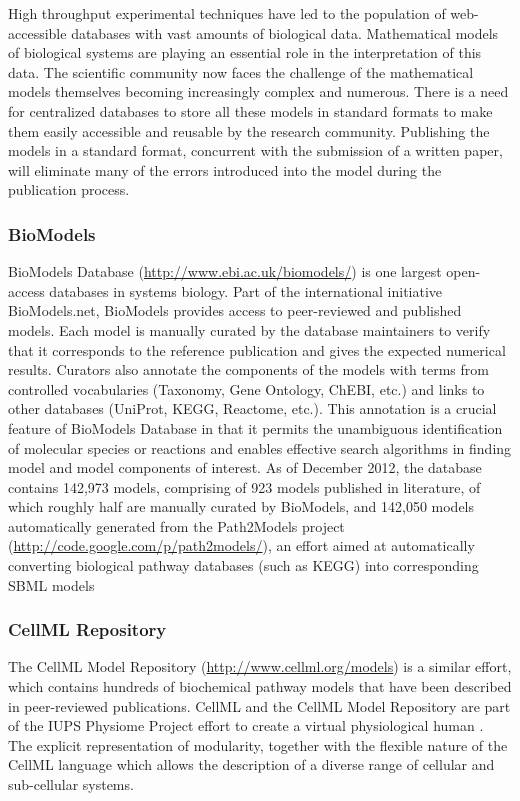 High throughput experimental techniques have led to the population of
web- accessible databases with vast amounts of biological data.
Mathematical models of biological systems are playing an essential role
in the interpretation of this data. The scientific community now faces
the challenge of the mathematical models themselves becoming
increasingly complex and numerous. There is a need for centralized
databases to store all these models in standard formats to make them
easily accessible and reusable by the research community. Publishing the
models in a standard format, concurrent with the submission of a written
paper, will eliminate many of the errors introduced into the model
during the publication process.

\subsubsection{BioModels}

BioModels Database (\url{http://www.ebi.ac.uk/biomodels/})
\autocite{le2006biomodels} is one largest open- access databases in
systems biology. Part of the international initiative BioModels.net,
BioModels provides access to peer-reviewed and published models. Each
model is manually curated by the database maintainers to verify that it
corresponds to the reference publication and gives the expected
numerical results. Curators also annotate the components of the models
with terms from controlled vocabularies (Taxonomy, Gene Ontology, ChEBI,
etc.) and links to other databases (UniProt, KEGG, Reactome, etc.). This
annotation is a crucial feature of BioModels Database in that it permits
the unambiguous identification of molecular species or reactions and
enables effective search algorithms in finding model and model
components of interest. As of December 2012, the database contains
142,973 models, comprising of 923 models published in literature, of
which roughly half are manually curated by BioModels, and 142,050 models
automatically generated from the Path2Models project
(\url{http://code.google.com/p/path2models/}), an effort aimed at
automatically converting biological pathway databases (such as KEGG)
into corresponding SBML models

\subsubsection{CellML Repository}

The CellML Model Repository (\url{http://www.cellml.org/models})
\autocite{lloyd2008cellml} \autocite{beard2009cellml} is a similar
effort, which contains hundreds of biochemical pathway models that have
been described in peer-reviewed publications. CellML and the CellML
Model Repository are part of the IUPS Physiome Project effort to create
a virtual physiological human \autocite{hunter2005integration}. The
explicit representation of modularity, together with the flexible nature
of the CellML language which allows the description of a diverse range
of cellular and sub-cellular systems.

